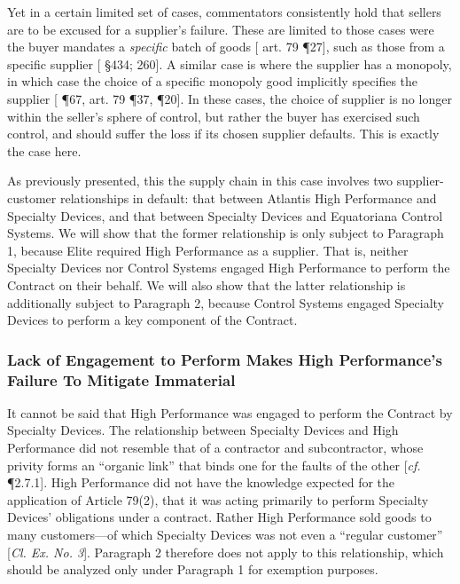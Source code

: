 Yet in a certain limited set of cases, commentators consistently hold that sellers are to be excused for a supplier's failure. These are limited to those cases were the buyer mandates a \textit{specific} batch of goods [\cite{Schwenzer} art. 79 \P27], such as those from a specific supplier [\cite{Honnold} \S434; \cite{Huber Mullis} 260]. A similar case is where the supplier has a monopoly, in which case the choice of a specific monopoly good implicitly specifies the supplier [\cite{Atamer} \P67, \cite{Schwenzer} art. 79 \P37, \cite{CISG-AC Op. No. 7} \P20]. In these cases, the choice of supplier is no longer within the seller's sphere of control, but rather the buyer has exercised such control, and should suffer the loss if its chosen supplier defaults. This is exactly the case here. 

As previously presented, this the supply chain in this case involves two supplier-customer relationships in default: that between Atlantis High Performance and Specialty Devices, and that between Specialty Devices and Equatoriana Control Systems.  We will show that the former relationship is only subject to Paragraph 1, because Elite required High Performance as a supplier. That is, neither Specialty Devices nor Control Systems engaged High Performance to perform the Contract on their behalf. We will also show that the latter relationship is additionally subject to Paragraph 2, because Control Systems engaged Specialty Devices to perform a key component of the Contract.  

\subsubsection{Lack of Engagement to Perform Makes High Performance's Failure To Mitigate Immaterial}

It cannot be said that High Performance was engaged to perform the Contract by Specialty Devices. The relationship between Specialty Devices and High Performance did not resemble that of a contractor and subcontractor, whose privity forms an ``organic link'' that binds one for the faults of the other [\textit{cf.} \cite{Tallon} \P2.7.1]. High Performance did not have the knowledge expected for the application of Article 79(2), that it was acting primarily to perform Specialty Devices' obligations under a contract. Rather High Performance sold goods to many customers---of which Specialty Devices was not even a ``regular customer'' [\textit{Cl. Ex. No. 3}].  Paragraph 2 therefore does not apply to this relationship, which should be analyzed only under Paragraph 1 for exemption purposes. 

